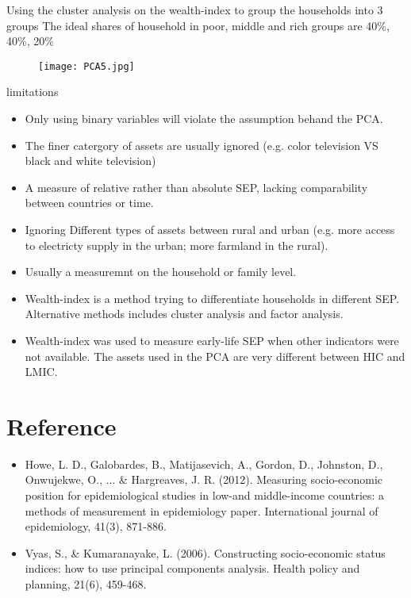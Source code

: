\documentclass[13pt]{beamer}
\begin{document}
\begin{frame}
	Using the cluster analysis on the wealth-index to group the households into 3 groups
	The ideal shares of household in poor, middle and rich groups are 40\%, 40\%, 20\% 
	\begin{figure}[!ht]
		\texttt{[image: PCA5.jpg]}
	\end{figure}
\end{frame}
\begin{frame}
	\begin{block}{limitations}
		\begin{itemize}
			\item Only using binary variables will violate the assumption behand the PCA.
			\item The finer catergory of assets are usually ignored (e.g. color television VS black and white television)
			\item A measure of relative rather  than absolute SEP, lacking comparability between countries or time.
			\item Ignoring Different types of assets between rural and urban (e.g. more access to electricty supply in the urban; more farmland in the rural).
			\item Usually a measuremnt on the household or family level.
		\end{itemize}
	\end{block}
\end{frame}
\begin{frame}
	\begin{itemize}
		\item Wealth-index is a method trying to differentiate households in different SEP. Alternative methods includes cluster analysis and factor analysis.
		\item Wealth-index was used to measure early-life SEP when other indicators were not available. The assets used in the PCA are very different between HIC and LMIC.
	\end{itemize}
\end{frame}
\section{Reference}
\begin{frame}
	\begin{itemize}
		\item Howe, L. D., Galobardes, B., Matijasevich, A., Gordon, D., Johnston, D., Onwujekwe, O., ... \& Hargreaves, J. R. (2012). Measuring socio-economic position for epidemiological studies in low-and middle-income countries: a methods of measurement in epidemiology paper. International journal of epidemiology, 41(3), 871-886.
		\item Vyas, S., \& Kumaranayake, L. (2006). Constructing socio-economic status indices: how to use principal components analysis. Health policy and planning, 21(6), 459-468.
	\end{itemize}
\end{frame}
\end{document}
